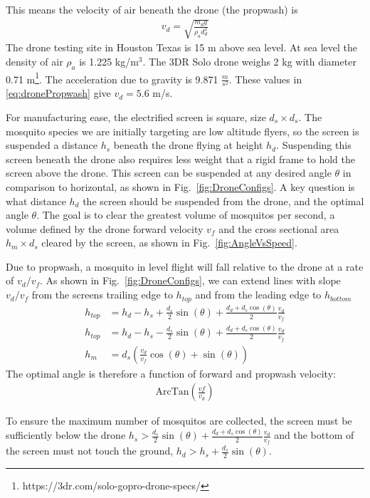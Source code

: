 \documentclass[letterpaper, 10 pt, conference]{ieeeconf}  %
\begin{document}
This means the velocity of air beneath the drone (the propwash) is
 \begin{align} \label{eq:dronePropwash}
v_d = \sqrt{ \frac{ m_d g}{\rho_a d_d^2} }
\end{align}
The drone testing site in Houston Texas is 15 m above sea level. At sea level the density of air $\rho_a$ is 1.225 kg/m$^3$.
The 3DR Solo drone weighs 2 kg with diameter 0.71 m\footnote{https://3dr.com/solo-gopro-drone-specs/}. The acceleration due to gravity is 9.871 $\frac{m}{s^2}$.  These values in \eqref{eq:dronePropwash} give $v_d = 5.6$ m/s.

For manufacturing ease, the electrified screen is square, size $d_s \times d_s$. The mosquito species we are initially targeting are low altitude flyers, so the screen is suspended a distance $h_s$ beneath the drone flying at height $h_d$.
Suspending this screen beneath the drone also requires less weight that a rigid frame to hold the screen above the drone.  This screen can be suspended at any desired angle $\theta$ in comparison to horizontal, as shown in Fig.~\ref{fig:DroneConfigs}.
A key question is what distance $h_d$ the screen should be suspended from the drone, and the optimal angle $\theta$.  The goal is to clear the greatest volume of mosquitos per second, a volume defined by the drone forward velocity $v_f$ and the cross sectional area $h_m \times d_s$ cleared by the screen, as shown in Fig.~\ref{fig:AngleVsSpeed}.

Due to propwash, a mosquito in level flight will fall relative to the drone at a rate of $v_d/v_f$.  As shown in Fig.~\ref{fig:DroneConfigs}, we can extend lines with slope $v_d/v_f$ from the screens trailing edge to $h_{top}$ and from the leading edge to $h_{bottom}$
 \begin{align} \label{eq:ClearedCrossSection}
h_{top} &= h_d - h_s + \frac{d_s}{2} \sin(\theta) +  \frac{d_d + d_s\cos(\theta)}{2}  \frac{v_d}{v_f} \nonumber \\
h_{top} &= h_d - h_s - \frac{d_s}{2} \sin(\theta) +  \frac{d_d + d_s\cos(\theta)}{2}  \frac{v_d}{v_f}  \nonumber \\
h_m &= d_s\left(\frac{v_d}{v_f}\cos(\theta) + \sin(\theta) \right)
\end{align}
The optimal angle is therefore a function of forward and propwash velocity:
\begin{align} \label{eq:OptimalScreenAngle}
\mathrm{ArcTan}\left(\frac{vf}{v_d}\right)
\end{align}

To ensure the maximum number of mosquitos are collected, the screen must be sufficiently below the drone $ h_s > \frac{d_s}{2} \sin(\theta) +  \frac{d_d + d_s\cos(\theta)}{2}  \frac{v_d}{v_f}$  and the bottom of the screen must not touch the ground, $ h_d > h_s + \frac{d_s}{2} \sin(\theta) $.
\end{document}
